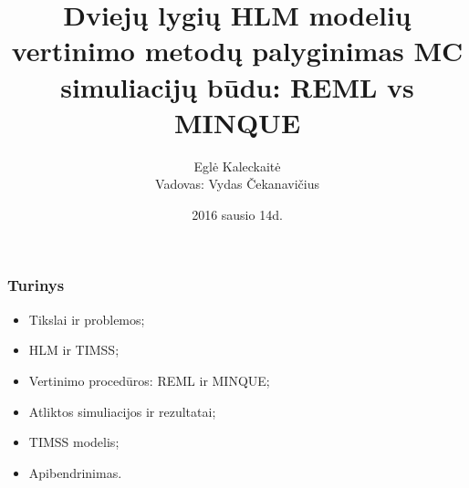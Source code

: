 \documentclass[utf8,hyperref={unicode,pdftex}]{beamer}
\title[\hspace{130pt} p. \insertpagenumber\enspace iš \insertdocumentendpage\enspace ]{Dviejų lygių HLM modelių vertinimo metodų palyginimas MC simuliacijų būdu: REML vs MINQUE}
\author[ E. Kaleckaitė]{Eglė Kaleckaitė\\
Vadovas: Vydas Čekanavičius}
\institute{Vilniaus Universitetas, Matematikos ir Informatikos Fakultetas}
\date{2016 sausio 14d.}
\begin{document}
\begin{frame}
\titlepage
\end{frame}
\begin{frame}
\frametitle{Turinys}
\begin{itemize}
\item Tikslai ir problemos;
\item HLM ir TIMSS;
\item Vertinimo procedūros: REML ir MINQUE;
\item Atliktos simuliacijos ir rezultatai;
\item TIMSS modelis;
\item Apibendrinimas.
\end{itemize}
\end{frame}
\end{document}
